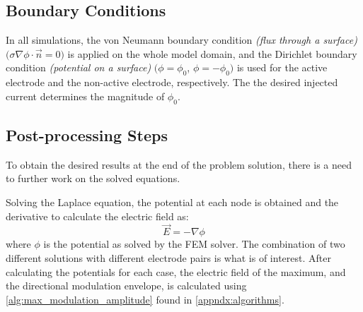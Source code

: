 \subsection{Boundary Conditions}
\label{subsec:solver_boundary_conditions}

In all simulations, the von Neumann boundary condition \textit{(flux through a surface)} $\big(\sigma\nabla\phi\cdot\vec{n} = 0\big)$ is applied on the whole model domain, and the Dirichlet boundary condition \textit{(potential on a surface)} $\big(\phi = \phi_0$, $\phi = -\phi_0\big)$ is used for the active electrode and the non-active electrode, respectively. The the desired injected current determines the magnitude of $\phi_0$.

\subsection{Post-processing Steps}

To obtain the desired results at the end of the problem solution, there is a need to further work on the solved equations.

Solving the Laplace equation, the potential at each node is obtained and the derivative to calculate the electric field as:
\begin{equation}
	\vec{E} = -\nabla\phi
\end{equation}
where $\phi$ is the potential as solved by the \gls{FEM} solver. The combination of two different solutions with different electrode pairs is what is of interest. After calculating the potentials for each case, the electric field of the maximum, and the directional modulation envelope, is calculated using \autoref{alg:max_modulation_amplitude} found in \autoref{appndx:algorithms}.
